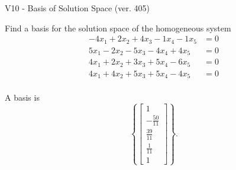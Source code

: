 \begin{exercise}
  \begin{exerciseTitle}V10 - Basis of Solution Space (ver. 405)\end{exerciseTitle}
  \begin{exerciseStatement}
    Find a basis for the solution space of the homogeneous system 
\begin{align*}
 -4 x_ 1 + 2 x_ 2 + 4 x_ 3 -1 x_ 4 -1 x_ 5 &= 0  \\ 
  5 x_ 1 -2 x_ 2 -5 x_ 3 -4 x_ 4 + 4 x_ 5 &= 0  \\ 
  4 x_ 1 + 2 x_ 2 + 3 x_ 3 + 5 x_ 4 -6 x_ 5 &= 0  \\ 
  4 x_ 1 + 4 x_ 2 + 5 x_ 3 + 5 x_ 4 -4 x_ 5 &= 0  \\ 
 \end{align*}


 
  \end{exerciseStatement}

  \begin{exerciseAnswer}
   A basis is   
\[\left\{\left[\begin{array}{c}
1 \\
-\frac{50}{11} \\
\frac{39}{11} \\
\frac{1}{11} \\
1
\end{array}\right]\right\}.\]

  


  \end{exerciseAnswer}
\end{exercise}